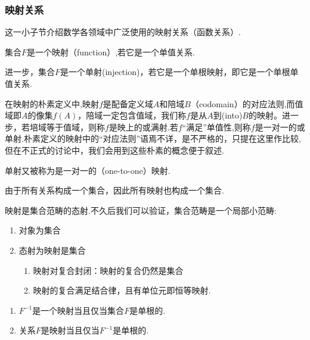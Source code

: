 \subsubsection{映射关系}

这一小子节介绍数学各领域中广泛使用的映射关系（函数关系）.

\begin{definition}
    [映射（函数）与单射]
    集合$F$是一个映射（function）,若它是一个单值关系.
    
    进一步，集合$F$是一个单射(injection)，若它是一个单根映射，即它是一个单根单值关系.
\end{definition}
在映射的朴素定义中,映射$f$是配备定义域$A$和陪域$B$（codomain）的对应法则,而值域即$A$的像集$f(A)$，陪域一定包含值域，我们称$f$是从$A$到(into)$B$的映射。进一步，若培域等于值域，则称$f$是映上的或满射.若$f$“满足”单值性,则称$f$是一对一的或单射.朴素定义的映射中的“对应法则”语焉不详，是不严格的，只提在这里作比较,但在不正式的讨论中，我们会用到这些朴素的概念便于叙述.
\begin{note}
    单射又被称为是一对一的（one-to-one）映射.
\end{note}
\begin{note}
    由于所有关系构成一个集合，因此所有映射也构成一个集合.
\end{note}

\begin{note}
    映射是集合范畴的态射.不久后我们可以验证，集合范畴是一个局部小范畴:
    \begin{enumerate}
        \item 对象为集合
        \item 态射为映射是集合
        \begin{enumerate}
        \item 映射对复合封闭：映射的复合仍然是集合
        \item 映射的复合满足结合律，且有单位元即恒等映射.
        \end{enumerate}
    \end{enumerate}
\end{note}

\begin{theorem}
    [$F$和$F^{-1}$关于单根单值性的关系]
    \begin{enumerate}
        \item $F^{-1}$是一个映射当且仅当集合$F$是单根的.
        \item 关系$F$是映射当且仅当$F^{-1}$是单根的.
    \end{enumerate}
\end{theorem}

